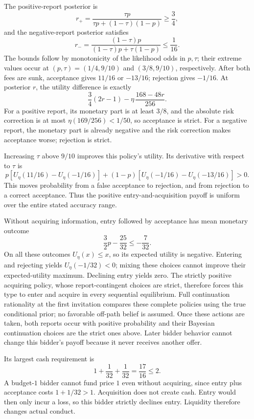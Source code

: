 \documentclass[11pt,a4paper]{article}
\numberwithin{equation}{section}
\theoremstyle{definition}
\begin{document}
The positive-report posterior is
\[
 r_+=\frac{\tau p}{\tau p+(1-\tau)(1-p)}\ge\frac34,
\]
and the negative-report posterior satisfies
\[
 r_-=\frac{(1-\tau)p}{(1-\tau)p+\tau(1-p)}\le\frac1{16}.
\]
The bounds follow by monotonicity of the likelihood odds in \(p,\tau\);
their extreme values occur at
\((p,\tau)=(1/4,9/10)\) and \((3/8,9/10)\), respectively.
After both fees are sunk, acceptance gives \(11/16\) or \(-13/16\);
rejection gives \(-1/16\).
At posterior \(r\), the utility difference is exactly
\[
 \frac34(2r-1)-\eta\,\frac{168-48r}{256}.
\]
For a positive report, its monetary part is at least \(3/8\), and
the absolute risk correction is at most
\(\eta(169/256)<1/50\), so acceptance is strict.
For a negative report, the monetary part is already negative and
the risk correction makes acceptance worse; rejection is strict.

Increasing \(\tau\) above \(9/10\) improves this policy's utility.
Its derivative with respect to \(\tau\) is
\[
 p[U_\eta(11/16)-U_\eta(-1/16)]
 +(1-p)[U_\eta(-1/16)-U_\eta(-13/16)]>0.
\]
This moves probability from a false acceptance to rejection, and
from rejection to a correct acceptance.
Thus the positive entry-and-acquisition payoff is uniform over
the entire stated accuracy range.

Without acquiring information, entry followed by acceptance has mean
monetary outcome
\[
 \frac32p-\frac{25}{32}\le-\frac7{32}.
\]
On all these outcomes \(U_\eta(x)\le x\), so its expected utility is
negative. Entering and rejecting yields \(U_\eta(-1/32)<0\);
mixing these choices cannot improve their expected-utility maximum.
Declining entry yields zero.
The strictly positive acquiring policy, whose report-contingent choices
are strict, therefore forces this type to enter and acquire in every
sequential equilibrium. Full continuation rationality at the first
invitation compares these complete policies using the true conditional
prior; no favorable off-path belief is assumed.
Once these actions are taken, both reports occur with positive probability
and their Bayesian continuation choices are the strict ones above.
Later bidder behavior cannot change this bidder's payoff because it
never receives another offer.

Its largest cash requirement is
\[
 1+\frac1{32}+\frac1{32}=\frac{17}{16}\le2.
\]
A budget-\(1\) bidder cannot fund price \(1\) even without acquiring,
since entry plus acceptance costs \(1+1/32>1\).
Acquisition does not create cash. Entry would then only incur a loss,
so this bidder strictly declines entry.
Liquidity therefore changes actual conduct.
\end{document}
